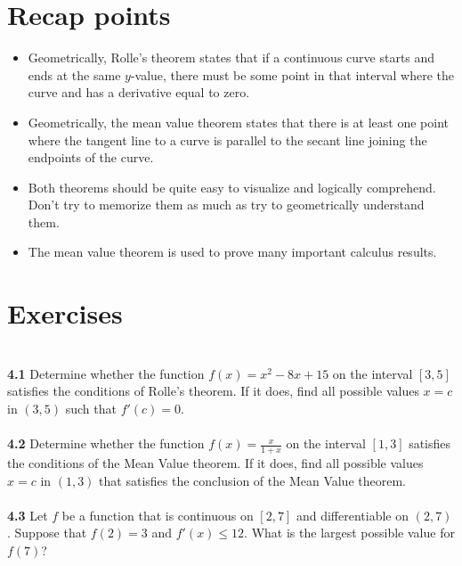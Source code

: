 \documentclass[11pt]{scrartcl}
\begin{document}
\section{Recap points}
\begin{itemize}
    \item Geometrically, Rolle's theorem states that if a continuous curve starts and ends at the same $y$-value, there must be some point in that interval where the curve  and has a derivative equal to zero. 
    \item Geometrically, the mean value theorem states that there is at least one point where the tangent line to a curve is parallel to the secant line joining the endpoints of the curve. 
    \item Both theorems should be quite easy to visualize and logically comprehend. Don't try to memorize them as much as try to geometrically understand them. 
    \item The mean value theorem is used to prove many important calculus results. 
\end{itemize}
\section{Exercises}\\
\noindent 
\textbf{4.1} Determine whether the function $f(x)=x^2-8x+15$ on the interval $[3,5]$ satisfies the conditions of Rolle's theorem. If it does, find all possible values $x=c$ in $(3,5)$ such that $f'(c)=0$. \\
\\
\noindent 
\textbf{4.2} Determine whether the function $f(x)=\frac{x}{1+x}$ on the interval $[1,3]$ satisfies the conditions of the Mean Value theorem. If it does, find all possible values $x=c$ in $(1,3)$ that satisfies the conclusion of the Mean Value theorem. \\
\\
\noindent 
\textbf{4.3}  Let $f$ be a function that is continuous on $[2,7]$ and differentiable on $(2,7)$. Suppose that $f(2)=3$ and $f'(x) \leq 12$. What is the largest possible value for $f(7)$? 
\end{document}
